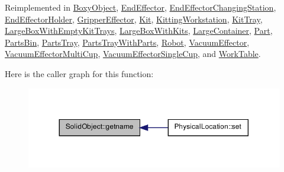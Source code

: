 Reimplemented in \hyperlink{class_boxy_object_ac088bb2ceeafc1dfa6bd008bd5a6b202}{BoxyObject}, \hyperlink{class_end_effector_a36e103bed34f4354487211af69eaea93}{EndEffector}, \hyperlink{class_end_effector_changing_station_a84a3564d9a1ce4edb2920e5656aa8ee5}{EndEffectorChangingStation}, \hyperlink{class_end_effector_holder_aa5d7eefe717071af41c4147be2f97367}{EndEffectorHolder}, \hyperlink{class_gripper_effector_af5309596cd435c504c8ffad6d9367a2d}{GripperEffector}, \hyperlink{class_kit_a484f7ee32f1dd698b513078ae9cb3cd9}{Kit}, \hyperlink{class_kitting_workstation_a8866f41855e3310f3e1548b9847a6443}{KittingWorkstation}, \hyperlink{class_kit_tray_a16417b0bcebb23afce3405349fe28dfd}{KitTray}, \hyperlink{class_large_box_with_empty_kit_trays_ae18c3b0611313032a1a2e18e90639365}{LargeBoxWithEmptyKitTrays}, \hyperlink{class_large_box_with_kits_a4e2846c64a39596e4ee1f4daf8eb231f}{LargeBoxWithKits}, \hyperlink{class_large_container_a6274fe329979a63a5605cf39d9237ec0}{LargeContainer}, \hyperlink{class_part_a298214c2287a508e2731964c9d902e1c}{Part}, \hyperlink{class_parts_bin_a2ff289ec33d41f80ef4d11ffca65abe5}{PartsBin}, \hyperlink{class_parts_tray_a73f4b19e484bb5cbaf170b5060056037}{PartsTray}, \hyperlink{class_parts_tray_with_parts_a3c0d0799ad4428108a37133f658c76d7}{PartsTrayWithParts}, \hyperlink{class_robot_ac68a539590d0fe227c07da18077e4085}{Robot}, \hyperlink{class_vacuum_effector_a471a9f8cfa7431bda4f60b1c1c81aba2}{VacuumEffector}, \hyperlink{class_vacuum_effector_multi_cup_a3b98a7a4ab4d4a86c8f917e9bbb3c539}{VacuumEffectorMultiCup}, \hyperlink{class_vacuum_effector_single_cup_ac6a49057ddb41b039d0c0be1365e6e9e}{VacuumEffectorSingleCup}, and \hyperlink{class_work_table_ad00c3838d6e330f3f939fbbe48183eef}{WorkTable}.



Here is the caller graph for this function:\nopagebreak
\begin{figure}[H]
\begin{center}
\leavevmode
\includegraphics[width=324pt]{class_solid_object_ae7b8a41f898f9463c0e298d3477fd95f_icgraph}
\end{center}
\end{figure}


